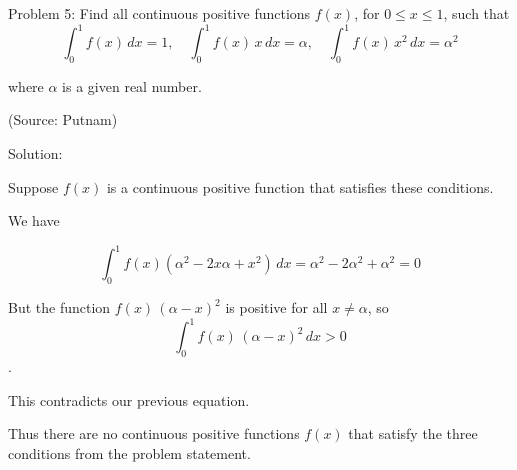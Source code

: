 Problem 5: Find all continuous positive functions $f(x)$, for $0 \le x \le 1$, such that $$\int_0^1 f(x) \, dx = 1, \quad \int_0^1 f(x) \, x \, dx = \alpha, \quad \int_0^1 f(x) \, x^2 \, dx = \alpha^2$$ 

where $\alpha$ is a given real number.

(Source: Putnam)

Solution:

Suppose $f(x)$ is a continuous positive function that satisfies these conditions.

We have 

$$ \int_0^1 f(x)(\alpha^2 - 2x\alpha + x^2) \, dx = \alpha^2 - 2\alpha^2 + \alpha^2 = 0 $$

But the function $f(x) \, (\alpha - x)^2$ is positive for all $x \neq \alpha$, so $$\int_0^1 f(x) \, (\alpha - x)^2 \, dx > 0$$.

This contradicts our previous equation.

Thus there are no continuous positive functions $f(x)$ that satisfy the three conditions from the problem statement.
